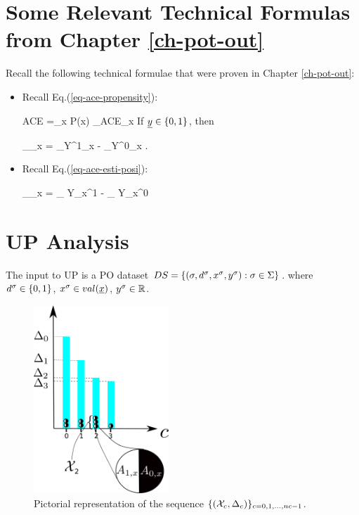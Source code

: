 \section{Some Relevant
 Technical Formulas from Chapter \ref{ch-pot-out}}
Recall
the following technical formulae
that were proven in 
Chapter \ref{ch-pot-out}:

\begin{itemize}

\item
Recall Eq.(\ref{eq-ace-propensity}):

\beq
ACE =\sum_x P(x)
_{ACE_x}
\eeq
If $\rvy\in \bool$, then

\beq
{}_{\displaystyle \delta_x}
=
_{\displaystyle Y^1_x}
-
_{\displaystyle Y^0_x}
\;.
\eeq

\item
Recall 
Eq.(\ref{eq-ace-esti-posi}):

\beq
{}_{\displaystyle\delta_x}
=
_
{\displaystyle Y_x^1}
-
_
{\displaystyle Y_x^0}
\label{eq-est-ace-uplift}
\eeq




\end{itemize}


\section{UP Analysis}
\label{sec-up-analysis}

The input
to UP is a PO
dataset $DS= \{ (\sigma, d^\sigma, x^\sigma, y^\sigma):
 \sigma\in\Sigma\}$.
where $d^\sigma\in \{0,1\}$, $x^\s \in val(\rvx)$,
$y^\sigma\in { \mathbb{R}}$.

\begin{figure}[h!]
\centering
\includegraphics[width=2in]
{uplift/uplift-bins.png}
\caption{
Pictorial
representation
of the sequence
$\{({\cal X}_c, \Delta_c)\}_{c=0, 1, \ldots, nc-1}$.
}
\label{fig-uplift-bins}
\end{figure}


